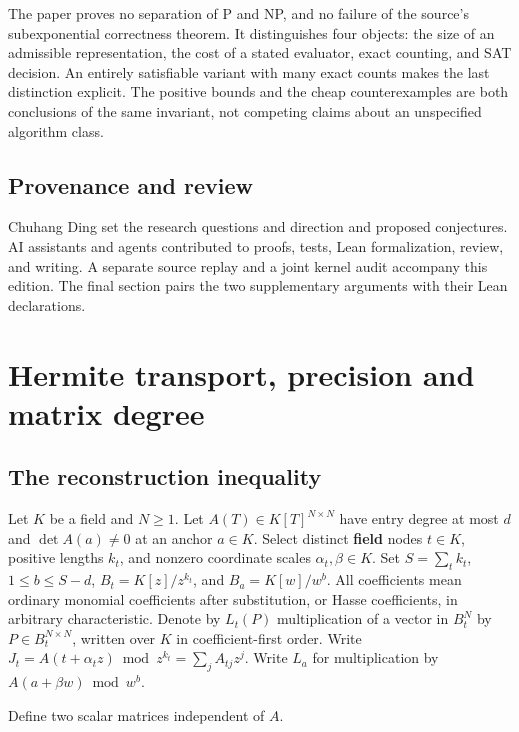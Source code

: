 \documentclass[
  11pt,
]{article}
\begin{document}
The paper proves no separation of P and NP, and no failure of the
source's subexponential correctness theorem. It distinguishes four
objects: the size of an admissible representation, the cost of a stated
evaluator, exact counting, and SAT decision. An entirely satisfiable
variant with many exact counts makes the last distinction explicit. The
positive bounds and the cheap counterexamples are both conclusions of
the same invariant, not competing claims about an unspecified algorithm
class.

\subsection{Provenance and review}\label{provenance-and-review}

Chuhang Ding set the research questions and direction and proposed conjectures. AI assistants and agents contributed to proofs, tests, Lean formalization, review, and writing. A separate source replay and a joint kernel audit accompany this edition. The final section pairs the two supplementary arguments with their Lean declarations.

\section{Hermite transport, precision and matrix
degree}\label{hermite-transport-precision-and-matrix-degree}

\subsection{The reconstruction
inequality}\label{the-reconstruction-inequality}

Let \(K\) be a field and \(N\ge1\). Let \(A(T)\in K[T]^{N\times N}\)
have entry degree at most \(d\) and \(\det A(a)\ne0\) at an anchor
\(a\in K\). Select distinct \textbf{field} nodes \(t\in K\), positive
lengths \(k_t\), and nonzero coordinate scales \(\alpha_t,\beta\in K\).
Set \(S=\sum_t k_t\), \(1\le b\le S-d\), \(B_t=K[z]/z^{k_t}\), and
\(B_a=K[w]/w^b\). All coefficients mean ordinary monomial coefficients
after substitution, or Hasse coefficients, in arbitrary characteristic.
Denote by \(L_t(P)\) multiplication of a vector in \(B_t^N\) by
\(P\in B_t^{N\times N}\), written over \(K\) in coefficient-first order.
Write \(J_t=A(t+\alpha_tz)\bmod z^{k_t}=\sum_j A_{tj}z^j\). Write
\(L_a\) for multiplication by \(A(a+\beta w)\bmod w^b\).

Define two scalar matrices independent of \(A\).
\end{document}
